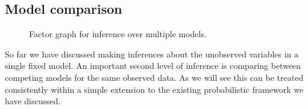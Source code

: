 \subsection{Model comparison}

\begin{figure}
\centering
{}
\caption[Model comparison factor graph.]{Factor graph for inference over multiple models.} %
\label{fig:model-comparison-factor-graph}
\end{figure}

So far we have discussed making inferences about the unobserved variables in a single fixed model. An important second level of inference is comparing between competing models for the same observed data. As we will see this can be treated consistently within a simple extension to the existing probabilistic framework we have discussed. 

